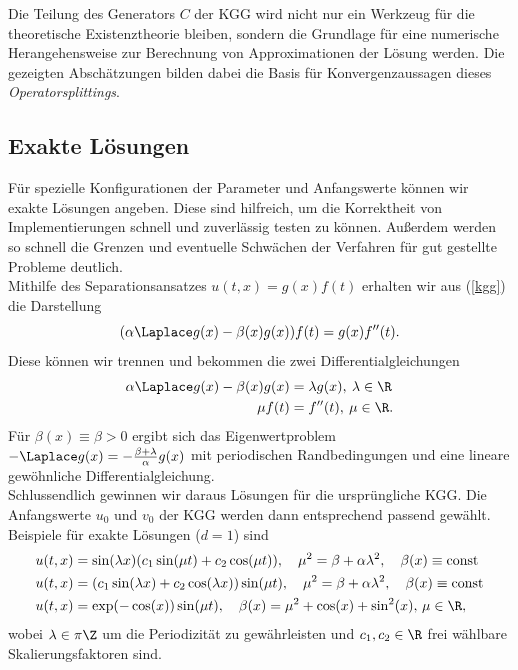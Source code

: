 Die Teilung des Generators $C$ der KGG wird nicht nur ein Werkzeug für die theoretische Existenztheorie bleiben, sondern die Grundlage für eine numerische Herangehensweise zur Berechnung von Approximationen der Lösung werden. Die gezeigten Abschätzungen bilden dabei die Basis für Konvergenzaussagen dieses \emph{Operatorsplittings}.
\subsection{Exakte Lösungen}
Für spezielle Konfigurationen der Parameter und Anfangswerte können wir exakte Lösungen angeben. Diese sind hilfreich, um die Korrektheit von Implementierungen schnell und zuverlässig testen zu können. Außerdem werden so schnell die Grenzen und eventuelle Schwächen der Verfahren für gut gestellte Probleme deutlich.\\[0.5cm]
Mithilfe des Separationsansatzes $u(t,x)=g(x)f(t)$ erhalten wir aus (\ref{kgg}) die Darstellung
\begin{equation*}
(\alpha\Laplace g(x)-\beta(x)g(x))f(t) = g(x)f''(t).
\end{equation*}
Diese können wir trennen und bekommen die zwei Differentialgleichungen
\begin{align*}
\alpha\Laplace g(x)-\beta(x)g(x)&=\lambda g(x), \: \lambda\in\R\\
\mu f(t)&=f''(t), \: \mu\in \R.
\end{align*}
Für $\beta(x) \equiv \beta>0$ ergibt sich das Eigenwertproblem $-\Laplace g(x)=-\frac{\beta + \lambda}{\alpha}g(x)$ mit periodischen Randbedingungen und eine lineare gewöhnliche Differentialgleichung.\\
Schlussendlich gewinnen wir daraus Lösungen für die ursprüngliche KGG. Die Anfangswerte $u_0$ und $v_0$ der KGG werden dann entsprechend passend gewählt.\\[1cm]
Beispiele für exakte Lösungen ($d=1$) sind
\begin{align*}
u(t,x)&=\sin(\lambda x)(c_1 \sin(\mu t) + c_2 \cos(\mu t)), \quad \mu^2=\beta+\alpha \lambda^2,\quad \beta(x)\equiv \text{const}\\ 
u(t,x)&=(c_1 \sin(\lambda x) + c_2 \cos(\lambda x))\sin(\mu t), \quad \mu^2=\beta+\alpha \lambda^2,\quad \beta(x)\equiv \text{const}\\
u(t,x)&=\exp(-\cos(x))\sin(\mu t), \quad \beta(x)=\mu^2+\cos(x)+\sin^2(x), \, \mu \in \R,
\end{align*}
wobei $\lambda\in \pi\Z$ um die Periodizität zu gewährleisten und $c_1, c_2 \in \R$ frei wählbare Skalierungsfaktoren sind.\\
